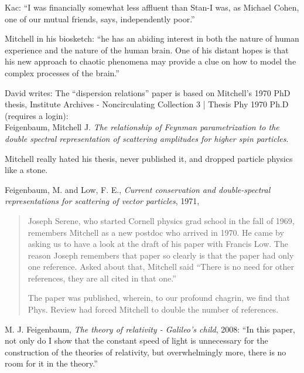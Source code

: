 \begin{description}
Kac: ``I was financially somewhat less affluent than Stan-I was, as
Michael Cohen, one of our mutual friends, says, independently poor.''

Mitchell in his biosketch: ``he has an abiding interest in both the
nature of human experience and the nature of the human brain. One of his
distant hopes is that his new approach to chaotic phenomena may provide a
clue on how to model the complex processes of the brain.''

\medskip

David writes:
The ``dispersion relations'' paper is
based on Mitchell's 1970 PhD thesis,
Institute Archives - Noncirculating Collection 3 |
{Thesis Phy 1970 Ph.D}
(requires a login):
\\
Feigenbaum, Mitchell J.
{\em The relationship of Feynman parametrization to the double spectral
representation of scattering amplitudes for higher spin particles}.

Mitchell really hated his thesis, never published it, and dropped
particle physics like a stone.

{Feigenbaum, M. and Low, F. E.},
  {\em Current conservation and double-spectral representations for scattering of vector particles},
{1971},
\begin{quote}
Joseph Serene, who started Cornell physics grad school in the fall of 1969,
remembers Mitchell as a new postdoc who arrived in
1970. He came by asking us to have a look at the draft of his paper with
{Francis Low}.
The reason Joseph remembers that paper so clearly is that the paper had
only one reference. Asked about that, Mitchell said ``There is no need for
other references, they are all cited in that one.''

The paper was published, wherein, to our profound chagrin,
we find that Phys. Review had forced Mitchell to double the number of
references.
\end{quote}

{M. J. Feigenbaum},
{\em The theory of relativity - {Galileo's} child},
{2008}:
``In this paper, not only do I show that the constant speed of light is
unnecessary for the construction of the theories of relativity, but
overwhelmingly more, there is no room for it in the theory.''


\end{description}
